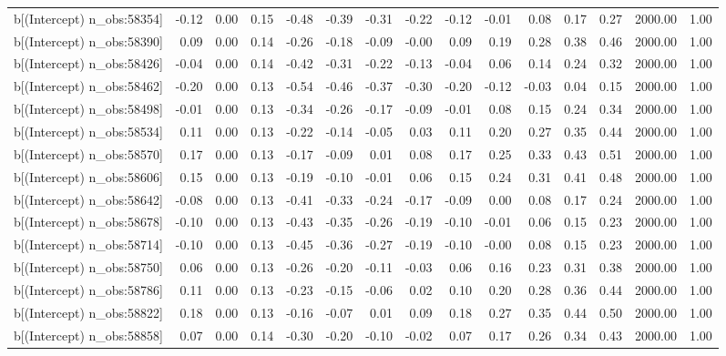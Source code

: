 \begin{table}[ht]
\begin{tabular}{rrrrrrrrrrrrrrr}
  b[(Intercept) n\_obs:58354] & -0.12 & 0.00 & 0.15 & -0.48 & -0.39 & -0.31 & -0.22 & -0.12 & -0.01 & 0.08 & 0.17 & 0.27 & 2000.00 & 1.00 \\ 
  b[(Intercept) n\_obs:58390] & 0.09 & 0.00 & 0.14 & -0.26 & -0.18 & -0.09 & -0.00 & 0.09 & 0.19 & 0.28 & 0.38 & 0.46 & 2000.00 & 1.00 \\ 
  b[(Intercept) n\_obs:58426] & -0.04 & 0.00 & 0.14 & -0.42 & -0.31 & -0.22 & -0.13 & -0.04 & 0.06 & 0.14 & 0.24 & 0.32 & 2000.00 & 1.00 \\ 
  b[(Intercept) n\_obs:58462] & -0.20 & 0.00 & 0.13 & -0.54 & -0.46 & -0.37 & -0.30 & -0.20 & -0.12 & -0.03 & 0.04 & 0.15 & 2000.00 & 1.00 \\ 
  b[(Intercept) n\_obs:58498] & -0.01 & 0.00 & 0.13 & -0.34 & -0.26 & -0.17 & -0.09 & -0.01 & 0.08 & 0.15 & 0.24 & 0.34 & 2000.00 & 1.00 \\ 
  b[(Intercept) n\_obs:58534] & 0.11 & 0.00 & 0.13 & -0.22 & -0.14 & -0.05 & 0.03 & 0.11 & 0.20 & 0.27 & 0.35 & 0.44 & 2000.00 & 1.00 \\ 
  b[(Intercept) n\_obs:58570] & 0.17 & 0.00 & 0.13 & -0.17 & -0.09 & 0.01 & 0.08 & 0.17 & 0.25 & 0.33 & 0.43 & 0.51 & 2000.00 & 1.00 \\ 
  b[(Intercept) n\_obs:58606] & 0.15 & 0.00 & 0.13 & -0.19 & -0.10 & -0.01 & 0.06 & 0.15 & 0.24 & 0.31 & 0.41 & 0.48 & 2000.00 & 1.00 \\ 
  b[(Intercept) n\_obs:58642] & -0.08 & 0.00 & 0.13 & -0.41 & -0.33 & -0.24 & -0.17 & -0.09 & 0.00 & 0.08 & 0.17 & 0.24 & 2000.00 & 1.00 \\ 
  b[(Intercept) n\_obs:58678] & -0.10 & 0.00 & 0.13 & -0.43 & -0.35 & -0.26 & -0.19 & -0.10 & -0.01 & 0.06 & 0.15 & 0.23 & 2000.00 & 1.00 \\ 
  b[(Intercept) n\_obs:58714] & -0.10 & 0.00 & 0.13 & -0.45 & -0.36 & -0.27 & -0.19 & -0.10 & -0.00 & 0.08 & 0.15 & 0.23 & 2000.00 & 1.00 \\ 
  b[(Intercept) n\_obs:58750] & 0.06 & 0.00 & 0.13 & -0.26 & -0.20 & -0.11 & -0.03 & 0.06 & 0.16 & 0.23 & 0.31 & 0.38 & 2000.00 & 1.00 \\ 
  b[(Intercept) n\_obs:58786] & 0.11 & 0.00 & 0.13 & -0.23 & -0.15 & -0.06 & 0.02 & 0.10 & 0.20 & 0.28 & 0.36 & 0.44 & 2000.00 & 1.00 \\ 
  b[(Intercept) n\_obs:58822] & 0.18 & 0.00 & 0.13 & -0.16 & -0.07 & 0.01 & 0.09 & 0.18 & 0.27 & 0.35 & 0.44 & 0.50 & 2000.00 & 1.00 \\ 
  b[(Intercept) n\_obs:58858] & 0.07 & 0.00 & 0.14 & -0.30 & -0.20 & -0.10 & -0.02 & 0.07 & 0.17 & 0.26 & 0.34 & 0.43 & 2000.00 & 1.00 \\ 

\end{tabular}
\end{table}
